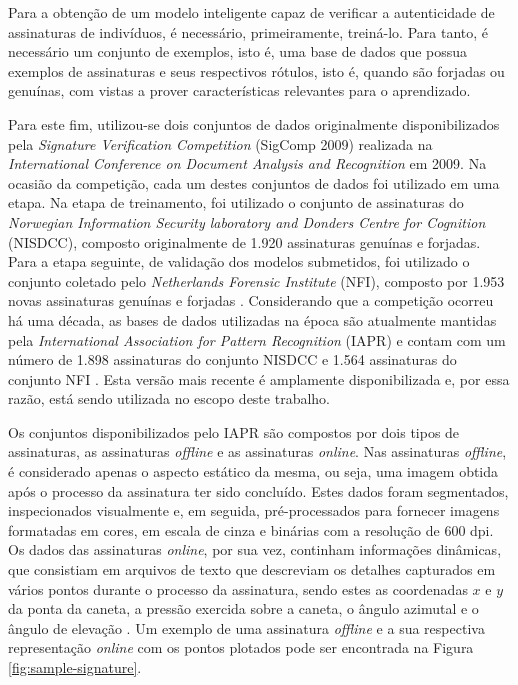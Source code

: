 Para a obtenção de um modelo inteligente capaz de verificar a autenticidade de assinaturas de indivíduos, é necessário, primeiramente, treiná-lo. Para tanto, é necessário um conjunto de exemplos, isto é, uma base de dados  que possua exemplos de assinaturas e seus respectivos rótulos, isto é, quando são forjadas ou genuínas, com vistas a prover características relevantes para o aprendizado.

Para este fim, utilizou-se dois conjuntos de dados originalmente disponibilizados pela
\emph{Signature Verification Competition} (SigComp 2009) realizada na \emph{International Conference on Document Analysis and Recognition} em 2009. Na ocasião da competição, cada um destes conjuntos de dados foi utilizado em uma etapa. Na etapa de treinamento, foi utilizado o conjunto de assinaturas do \emph{Norwegian Information Security laboratory and Donders Centre for Cognition} (NISDCC), composto originalmente de 1.920 assinaturas genuínas e forjadas. Para a etapa seguinte, de validação dos modelos submetidos, foi utilizado o conjunto coletado pelo \emph{Netherlands Forensic Institute} (NFI), composto por 1.953 novas assinaturas genuínas e forjadas \cite{icdar2009}. Considerando que a competição ocorreu há uma década, as bases de dados utilizadas na época são atualmente mantidas pela \emph{International Association for Pattern Recognition} (IAPR) e contam com um número de 1.898 assinaturas do conjunto NISDCC e 1.564 assinaturas do conjunto NFI \cite{iapr-tc11}. Esta versão mais recente é amplamente disponibilizada e, por essa razão, está sendo utilizada no escopo deste trabalho.

Os conjuntos disponibilizados pelo IAPR são compostos por dois tipos de assinaturas, as assinaturas \emph{offline} e as assinaturas \emph{online}. Nas assinaturas \emph{offline}, é considerado apenas o aspecto estático da mesma, ou seja, uma imagem obtida após o processo da assinatura ter sido concluído. Estes dados foram segmentados, inspecionados visualmente e, em seguida, pré-processados para fornecer imagens formatadas em cores, em escala de cinza e binárias com a resolução de $600$ dpi. Os dados das assinaturas \emph{online}, por sua vez, continham informações dinâmicas, que consistiam em arquivos de texto que descreviam os detalhes capturados em vários pontos durante o processo da assinatura, sendo estes as coordenadas $x$ e $y$ da ponta da caneta, a pressão exercida sobre a caneta, o ângulo azimutal e o ângulo de elevação \cite{icdar2009}. Um exemplo de uma assinatura \emph{offline} e a sua respectiva representação \emph{online} com os pontos plotados pode ser encontrada na Figura \ref{fig:sample-signature}.


